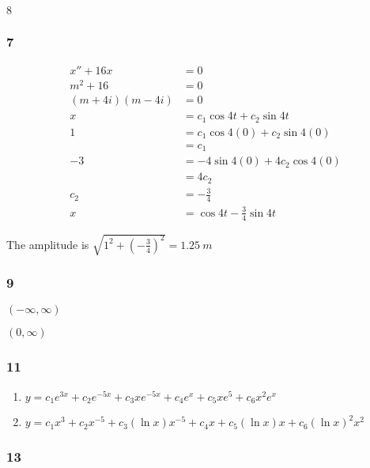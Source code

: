 \documentclass{article}
\begin{document}
$8$

\subsubsection{7}

\begin{align*}
  x'' + 16 x        & = 0                                \\
  m^2 + 16          & = 0                                \\
  (m + 4i) (m - 4i) & = 0                                \\
  x                 & = c_1 \cos 4 t + c_2 \sin 4 t      \\
  1                 & = c_1 \cos 4 (0) + c_2 \sin 4 (0)  \\
                    & = c_1                              \\
  -3                & = -4 \sin 4 (0) + 4 c_2 \cos 4 (0) \\
                    & = 4 c_2                            \\
  c_2               & = -\frac{3}{4}                     \\
  x                 & = \cos 4 t - \frac{3}{4} \sin 4 t
\end{align*}

The amplitude is $\sqrt{1^2 + \left( -\frac{3}{4} \right)^2} = \qty{1.25}{m}$

\subsubsection{9}

$(-\infty, \infty)$

$(0, \infty)$

\subsubsection{11}

\begin{enumerate}
  \item $y = c_1 e^{3 x} + c_2 e^{-5 x} + c_3 x e^{-5 x} + c_4 e^x + c_5 x e^5 + c_6 x^2 e^x$

  \item $y = c_1 x^3 + c_2 x^{-5} + c_3 (\ln x) x^{-5} + c_4 x + c_5 (\ln x) x + c_6 (\ln x)^2 x^2$
\end{enumerate}

\subsubsection{13}
\end{document}
